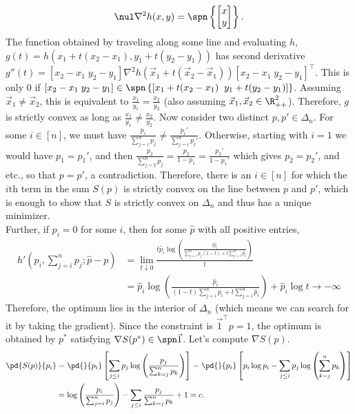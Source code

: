 \documentclass[../borwein-lewis_notes.tex]{subfiles}
\begin{document}
\begin{enumerate}[(a)]
{\begin{equation*}
\nul\nabla^2h(x,y) = \spn\left\{\begin{bmatrix} x \\ y \end{bmatrix}
\right\}.
\end{equation*}
The function obtained by traveling along some line and evaluating 
$h$, $g(t) = h(x_1+t(x_2-x_1), y_1+t(y_2-y_1))$ has second 
derivative $g''(t) = [x_2-x_1\;y_2-y_1]\nabla^2h(\vec x_1+t(\vec x_2
-\vec x_1))[x_2-x_1\;y_2-y_1]^\top$. This is only 0 if  
$[x_2-x_1\;y_2-y_1]\in\spn\left\{[x_1+t(x_2-x_1)\;\;
y_1+t(y_2-y_1)]\right\}$. Assuming $\vec x_1 \neq \vec x_2$, this 
is equivalent to $\frac{x_1}{y_1}=\frac{x_2}{y_2}$ (also assuming 
$\vec x_1,\vec x_2 \in\R_{++}^2$). Therefore, $g$ is strictly 
convex as long as $\frac{x_1}{y_1}\neq \frac{x_2}{y_2}$. Now 
consider two distinct $p,p'\in\Delta_n$. For some $i\in[n]$, we must 
have $\frac{p_i}{\sum_{j=i}^n p_j} \neq \frac{p_i'}{\sum_{j=i}^n
p_j'}$. Otherwise, starting with $i=1$ we would have $p_1=p_1'$, 
and then $\frac{p_2}{\sum_{j=2}^n p_j}=\frac{p_2}{1-p_1} =
\frac{p_2'}{1-p_1'}$ which gives $p_2=p_2'$, and etc., so that 
$p=p'$, a contradiction. Therefore, there is an $i\in[n]$ for which 
the $i$th term in the sum $S(p)$ is strictly convex on the line 
between $p$ and $p'$, which is enough to show that $S$ is strictly 
convex on $\Delta_n$ and thus has a unique minimizer. \\
Further, if $p_i=0$ for some $i$, then for some $\hat p$ with all 
positive entries, 
\begin{align*}
h'(p_i, \sum_{j=i}^n p_j; \hat p-p) &= \lim_{t\downarrow 0}
\frac{t\hat p_i\log\left(\frac{t\hat p_i}{\sum_{j=i}^n p_j(1-t)
+ t\sum_{j=i}^n \hat p_i}\right)}{t}\\
& =\hat p_i\log\left(\frac{
\hat p_i}{(1-t)\sum_{j=i}^n p_i + t\sum_{j=i}^n \hat p_i}\right)
+ \hat p_i\log t\to -\infty
\end{align*}
Therefore, the optimum lies in the interior of $\Delta_n$ (which means 
we can search for it by taking the gradient). Since the 
constraint is $\vec 1^\top p = 1$, the optimum is obtained by $p^*$ 
satisfying $\nabla S(p^*) \in \spn\vec 1$. Let's compute $\nabla S(p)$.
\begin{align*}
\pd{S(p)}{p_i} &= \pd{}{p_i}\left[\sum_{j\leq i} p_j\log\left(\frac{p_j}{ 
\sum_{k=j}^n p_k}\right)\right] = 
\pd{}{p_i}\left[p_i\log p_i - \sum_{j\leq i}p_j\log\left(\sum_{k=j}^n
p_k\right)\right]  \\
&= \log \left(\frac{p_i}{\sum_{j=i}^n p_j}\right) - \sum_{j\leq i}
\frac{p_j}{\sum_{k=j}^n p_k} + 1 = c.

\end{align*}}
\end{enumerate}
\end{document}
